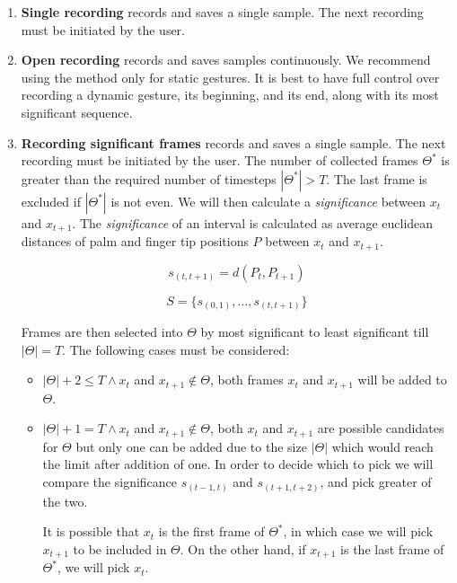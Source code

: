 \begin{enumerate}
    \item \textbf{Single recording} records and saves a single sample. The next recording must be initiated by the user.
    \item \textbf{Open recording} records and saves samples continuously. We recommend using the method only for static gestures. It is best to have full control over recording a dynamic gesture, its beginning, and its end, along with its most significant sequence.
    \item \textbf{Recording significant frames} records and saves a single sample. The next recording must be initiated by the user. The number of collected frames $\Theta^*$ is greater than the required number of timesteps $|\Theta^*| > T$. The last frame is excluded if $|\Theta^*|$ is not even. We will then calculate a \textit{significance} between $x_t$ and $x_{t+1}$.
    The \textit{significance} of an interval is calculated as average euclidean distances of palm and finger tip positions $P$ between $x_t$ and $x_{t+1}$.

    \begin{equation}
        {s_{(t, t+1)} = d(P_{t}, P_{t+1})}
    \end{equation}

    \begin{equation}
        {S = \{s_{(0, 1)}, ...,s_{(t, t+1)}\}}
    \end{equation}

    Frames are then selected into $\Theta$ by most significant to least significant till $|\Theta| = T$. The following cases must be considered:
    \begin{itemize}
        \item $|\Theta| + 2 \leq T \land x_t$ and $x_{t+1} \notin \Theta$, both frames $x_t$ and $x_{t+1}$ will be added to $\Theta$.
        \item $|\Theta| + 1 = T \land x_t$ and $x_{t+1} \notin \Theta$, both $x_t$ and $x_{t+1}$ are possible candidates for $\Theta$ but only one can be added due to the size $|\Theta|$ which would reach the limit after addition of one. In order to decide which to pick we will compare the significance $s_{(t-1, t)}$ and $s_{(t+1, t+2)}$, and pick greater of the two.
        
        It is possible that $x_t$ is the first frame of $\Theta^*$, in which case we will pick $x_{t+1}$ to be included in $\Theta$. On the other hand, if $x_{t+1}$ is the last frame of $\Theta^*$, we will pick $x_t$.
        

\end{itemize}
\end{enumerate}
